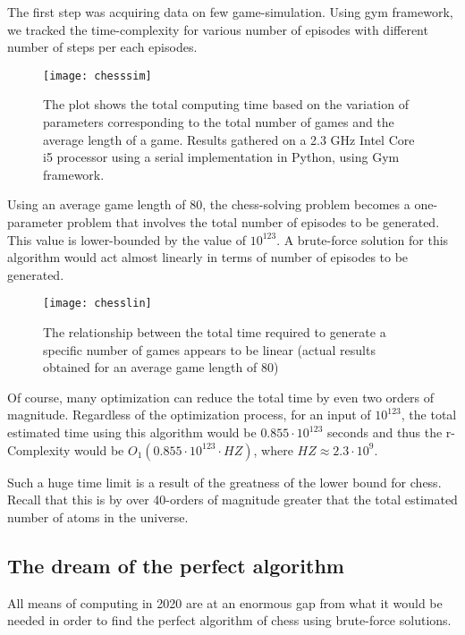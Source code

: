 The first step was acquiring data on few game-simulation. Using gym framework, we tracked the time-complexity for various number of episodes with different number of steps per each episodes.

    \begin{figure}[H]
        \centering
        \texttt{[image: chesssim]}
        \caption{The plot shows the total computing time based on the variation of parameters corresponding to the total number of games and the average length of a game. Results gathered on a 2.3 GHz Intel Core i5 processor using a serial implementation in Python, using Gym framework. }
    \end{figure}

Using an average game length of 80, the chess-solving problem becomes a one-parameter problem that involves the total number of episodes to be generated. This value is lower-bounded by the value of $10^{123}$. A brute-force solution for this algorithm would act almost linearly in terms of number of episodes to be generated.

    \begin{figure}[H]
        \centering
        \texttt{[image: chesslin]}
        \caption{The relationship between the total time required to generate a specific number of games appears to be linear (actual results obtained for an average game length of 80)}
    \end{figure}
 
Of course, many optimization can reduce the total time by even two orders of magnitude. Regardless of the optimization process, for an input of $10^{123}$, the total estimated time using this algorithm would be $0.855 \cdot 10^{123}$ seconds and thus the r-Complexity would be $O_{1}(0.855 \cdot 10^{123} \cdot HZ)$, where $HZ \approx 2.3 \cdot 10^9$.

Such a huge time limit is a result of the greatness of the lower bound for chess. Recall that this is by over 40-orders of magnitude greater that the total estimated number of atoms in the universe.

\subsection{The dream of the perfect algorithm}
All means of computing in 2020 are at an enormous gap from what it would be needed in order to find the perfect algorithm of chess using brute-force solutions. 

